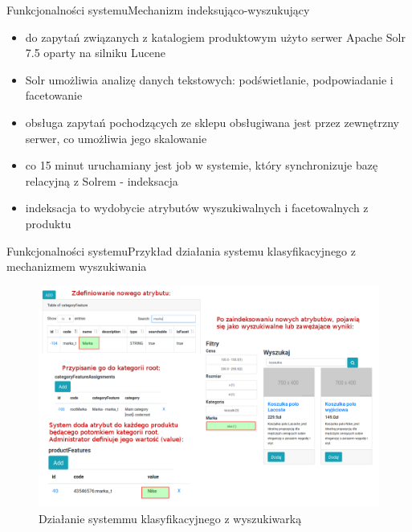 \documentclass[polish,xcolor=table,9pt,aspectratio=1610,hyperref={pdfpagemode=FullScreen}]{beamer}
\begin{document}
\begin{frame}{Funkcjonalności systemu}{Mechanizm indeksująco-wyszukujący}
\begin{itemize}
	\item<1-> do zapytań związanych z katalogiem produktowym użyto serwer Apache Solr 7.5 oparty na silniku Lucene
	\item<1-> Solr umożliwia analizę danych tekstowych: podświetlanie, podpowiadanie i facetowanie 
	\item<1-> obsługa zapytań pochodzących ze sklepu obsługiwana jest przez zewnętrzny serwer, co umożliwia jego skalowanie
	\item<1-> co 15 minut uruchamiany jest job w systemie, który synchronizuje bazę relacyjną z Solrem - indeksacja
	\item<1-> indeksacja to wydobycie atrybutów wyszukiwalnych i facetowalnych z produktu
\end{itemize}
\end{frame}

\begin{frame}{Funkcjonalności systemu}{Przykład działania systemu klasyfikacyjnego z mechanizmem wyszukiwania}
	\begin{figure}
		\begin{center}
			\includegraphics[scale=0.3]{sysklas-wyszfacet.png}
		\end{center}
		\caption{{\color{black}Działanie systemmu klasyfikacyjnego z wyszukiwarką}} 
	\end{figure}
\end{frame}
\end{document}
